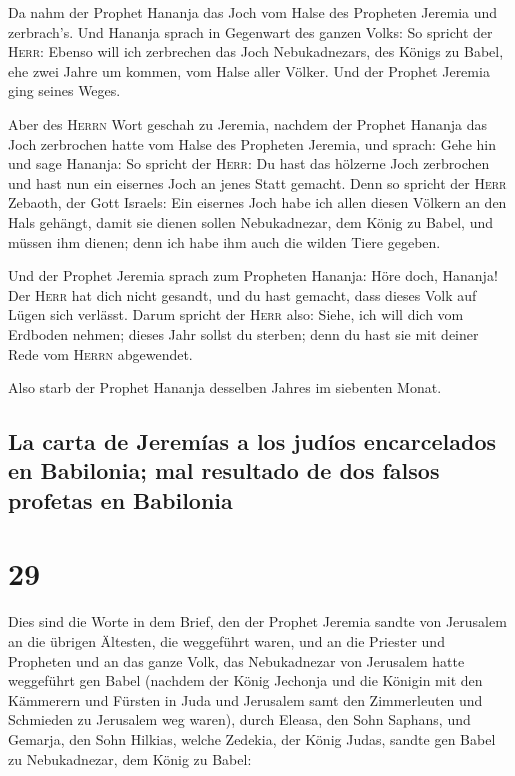  Da nahm der Prophet Hananja das Joch vom Halse des
Propheten Jeremia und zerbrach's.  Und Hananja sprach in
Gegenwart des ganzen Volks: So spricht der \textsc{Herr}: Ebenso will
ich zerbrechen das Joch Nebukadnezars, des Königs zu Babel, ehe zwei
Jahre um kommen, vom Halse aller Völker. Und der Prophet Jeremia ging
seines Weges.

 Aber des \textsc{Herrn} Wort geschah zu Jeremia, nachdem
der Prophet Hananja das Joch zerbrochen hatte vom Halse des Propheten
Jeremia, und sprach:  Gehe hin und sage Hananja: So
spricht der \textsc{Herr}: Du hast das hölzerne Joch zerbrochen und hast
nun ein eisernes Joch an jenes Statt gemacht.  Denn so
spricht der \textsc{Herr} Zebaoth, der Gott Israels: Ein eisernes Joch
habe ich allen diesen Völkern an den Hals gehängt, damit sie dienen
sollen Nebukadnezar, dem König zu Babel, und müssen ihm dienen; denn ich
habe ihm auch die wilden Tiere gegeben.

 Und der Prophet Jeremia sprach zum Propheten Hananja:
Höre doch, Hananja! Der \textsc{Herr} hat dich nicht gesandt, und du
hast gemacht, dass dieses Volk auf Lügen sich verlässt. 
Darum spricht der \textsc{Herr} also: Siehe, ich will dich vom Erdboden
nehmen; dieses Jahr sollst du sterben; denn du hast sie mit deiner Rede
vom \textsc{Herrn} abgewendet.

 Also starb der Prophet Hananja desselben Jahres im
siebenten Monat.

\hypertarget{la-carta-de-jeremuxedas-a-los-juduxedos-encarcelados-en-babilonia-mal-resultado-de-dos-falsos-profetas-en-babilonia}{%
\subsection{La carta de Jeremías a los judíos encarcelados en Babilonia;
mal resultado de dos falsos profetas en
Babilonia}\label{la-carta-de-jeremuxedas-a-los-juduxedos-encarcelados-en-babilonia-mal-resultado-de-dos-falsos-profetas-en-babilonia}}

\hypertarget{section-28}{%
\section{29}\label{section-28}}

 Dies sind die Worte in dem Brief, den der Prophet Jeremia
sandte von Jerusalem an die übrigen Ältesten, die weggeführt waren, und
an die Priester und Propheten und an das ganze Volk, das Nebukadnezar
von Jerusalem hatte weggeführt gen Babel  (nachdem der
König Jechonja und die Königin mit den Kämmerern und Fürsten in Juda und
Jerusalem samt den Zimmerleuten und Schmieden zu Jerusalem weg waren),
 durch Eleasa, den Sohn Saphans, und Gemarja, den Sohn
Hilkias, welche Zedekia, der König Judas, sandte gen Babel zu
Nebukadnezar, dem König zu Babel:

